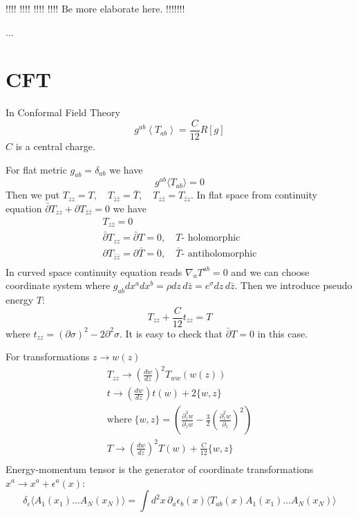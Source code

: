 \documentclass[a4paper,12pt]{article}
\theoremstyle{definition} \newtheorem{Def}{Definition}
\begin{document}
!!!! !!!! !!!! !!!! 
Be more elaborate here.
!!!!!!!

...
\section{CFT}
\label{sec:cft}

In Conformal Field Theory 
\begin{equation}
  \label{eq:46}
  g^{ab}\left<T_{ab}\right>=\frac{C}{12}R[g]
\end{equation}
$C$ is a central charge.

For flat metric $g_{ab}=\delta_{ab}$ we have
\begin{equation}
  \label{eq:47}
  g^{ab}\langle T_{ab} \rangle=0
\end{equation}
Then we put $T_{zz}=T,\quad T_{\bar{z}\bar{z}}=\bar{T},\quad T_{z\bar{z}}=T_{\bar{z}z}$. In flat space from continuity equation $\bar{\partial}T_{zz}+\partial T_{\bar{z}\bar{z}}=0$ we have
\begin{equation}
  \label{eq:49}
  \begin{split}
    T_{z\bar{z}}=0\\
    \bar{\partial}T_{zz}=\bar{\partial}T=0,\quad T \mbox{- holomorphic}\\
    \partial T_{\bar{z}\bar{z}}=\partial \bar{T}=0,\quad \bar{T} \mbox{- antiholomorphic}\\
  \end{split}
\end{equation}
In curved space continuity equation reads $\nabla_a T^{ab}=0$ and we can choose coordinate system where $g_{ab}dx^a dx^b = \rho dz\, d\bar{z}=e^{\sigma}dz\,d\bar{z}$. Then we introduce pseudo energy $T$:
\begin{equation}
  \label{eq:50}
  T_{zz}+\frac{C}{12}t_{zz}=T
\end{equation}
where $t_{zz}=(\partial \sigma)^2-2\partial^2 \sigma$. It is easy to check that $\bar{\partial}T=0$ in this case.

For transformations $z\to w(z)$
\begin{equation}
  \label{eq:51}
  \begin{split}
    T_{zz}\to \left(\frac{dw}{dz}\right)^2 T_{ww}(w(z))\\
    t\to \left(\frac{dw}{dz}\right)t(w)+2\{w,z\}\\
    \mbox{where}\; \{w,z\}=\left(\frac{\partial_z^3 w}{\partial_z w}-\frac{3}{2}\left(\frac{\partial_z^2 w}{\partial_z}\right)^2\right)\\
    T\to \left(\frac{dw}{dz}\right)^2 T(w)+\frac{C}{12}\{w,z\}\\
  \end{split}
\end{equation}
Energy-momentum tensor is the generator of coordinate transformations $x^a\to x^a+\epsilon^a(x)$:
\begin{equation}
  \label{eq:52}
  \delta_{\epsilon}\langle A_1(x_1)\dots A_N(x_N)\rangle = \int d^2x\, \partial_a \epsilon_b(x)\langle T_{ab}(x) A_1(x_1)\dots A_N(x_N)\rangle
\end{equation}
\end{document}
